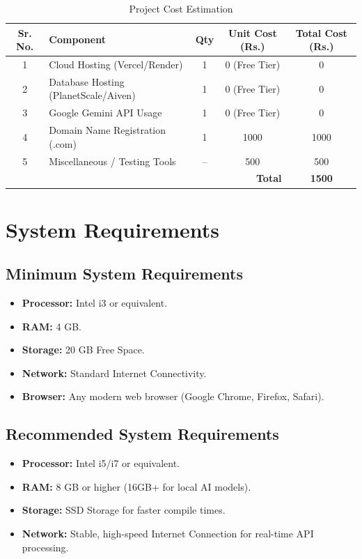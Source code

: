 \documentclass[12pt,a4paper]{report}
\begin{document}
\begin{table}[H]
\centering
\begin{tabular}{|c|p{4.5cm}|c|c|c|}
\hline
\textbf{Sr. No.} & \textbf{Component} & \textbf{Qty} & \textbf{Unit Cost (Rs.)} & \textbf{Total Cost (Rs.)} \\ \hline
1 & Cloud Hosting (Vercel/Render) & 1 & 0 (Free Tier) & 0 \\ \hline
2 & Database Hosting (PlanetScale/Aiven) & 1 & 0 (Free Tier) & 0 \\ \hline
3 & Google Gemini API Usage & 1 & 0 (Free Tier) & 0 \\ \hline
4 & Domain Name Registration (.com) & 1 & 1000 & 1000 \\ \hline
5 & Miscellaneous / Testing Tools & -- & 500 & 500 \\ \hline
\multicolumn{4}{|r|}{\textbf{Total}} & \textbf{1500} \\ \hline
\end{tabular}
\caption{Project Cost Estimation}
\end{table}

\section{System Requirements}

\subsection{Minimum System Requirements}
\begin{itemize}[leftmargin=*]
    \item \textbf{Processor:} Intel i3 or equivalent.
    \item \textbf{RAM:} 4 GB.
    \item \textbf{Storage:} 20 GB Free Space.
    \item \textbf{Network:} Standard Internet Connectivity.
    \item \textbf{Browser:} Any modern web browser (Google Chrome, Firefox, Safari).
\end{itemize}

\subsection{Recommended System Requirements}
\begin{itemize}[leftmargin=*]
    \item \textbf{Processor:} Intel i5/i7 or equivalent.
    \item \textbf{RAM:} 8 GB or higher (16GB+ for local AI models).
    \item \textbf{Storage:} SSD Storage for faster compile times.
    \item \textbf{Network:} Stable, high-speed Internet Connection for real-time API processing.
\end{itemize}
\end{document}
